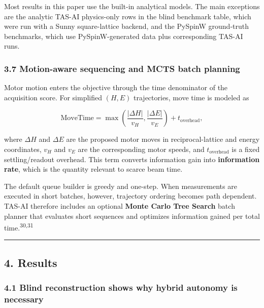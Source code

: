 \documentclass[
]{article}
\begin{document}
Most results in this paper use the built-in analytical models. The main
exceptions are the analytic TAS-AI physics-only rows in the blind
benchmark table, which were run with a Sunny square-lattice backend, and
the PySpinW ground-truth benchmarks, which use PySpinW-generated data
plus corresponding TAS-AI runs.

\hypertarget{motion-aware-sequencing-and-mcts-batch-planning}{%
\subsubsection{3.7 Motion-aware sequencing and MCTS batch
planning}\label{motion-aware-sequencing-and-mcts-batch-planning}}

Motor motion enters the objective through the time denominator of the
acquisition score. For simplified \((H,E)\) trajectories, move time is
modeled as

\[
\mathrm{MoveTime}
=
\max\!\left(\frac{|\Delta H|}{v_H}, \frac{|\Delta E|}{v_E}\right)
+
t_{\mathrm{overhead}},
\]

where \(\Delta H\) and \(\Delta E\) are the proposed motor moves in
reciprocal-lattice and energy coordinates, \(v_H\) and \(v_E\) are the
corresponding motor speeds, and \(t_{\mathrm{overhead}}\) is a fixed
settling/readout overhead. This term converts information gain into
\textbf{information rate}, which is the quantity relevant to scarce beam
time.

The default queue builder is greedy and one-step. When measurements are
executed in short batches, however, trajectory ordering becomes path
dependent. TAS-AI therefore includes an optional \textbf{Monte Carlo
Tree Search} batch planner that evaluates short sequences and optimizes
information gained per total time.\textsuperscript{30,31}

\begin{center}\rule{0.5\linewidth}{0.5pt}\end{center}

\hypertarget{results}{%
\subsection{4. Results}\label{results}}

\hypertarget{blind-reconstruction-shows-why-hybrid-autonomy-is-necessary}{%
\subsubsection{4.1 Blind reconstruction shows why hybrid autonomy is
necessary}\label{blind-reconstruction-shows-why-hybrid-autonomy-is-necessary}}
\end{document}
